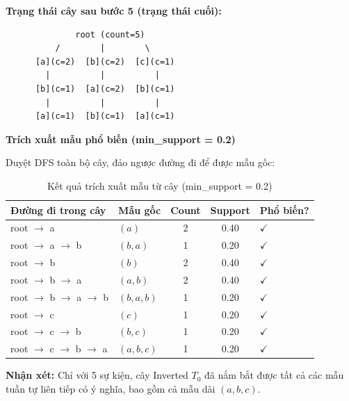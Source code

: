 \documentclass[14pt,a4paper,oneside]{extreport}
\begin{document}
\textbf{Trạng thái cây sau bước 5 (trạng thái cuối):}
\begin{verbatim}
              root (count=5)
          /        |        \
      [a](c=2)  [b](c=2)  [c](c=1)
        |          |          |
      [b](c=1)  [a](c=2)  [b](c=1)
        |          |          |
      [a](c=1)  [b](c=1)  [a](c=1)
\end{verbatim}

\vspace{1em}
\noindent\textbf{Trích xuất mẫu phổ biến (min\_support = 0.2)}

Duyệt DFS toàn bộ cây, đảo ngược đường đi để được mẫu gốc:

\begin{table}[H]
    \centering
    \caption{Kết quả trích xuất mẫu từ cây (min\_support = 0.2)}
    \label{tab:trace_patterns}
    \begin{tabular}{llccl}
        \toprule
        \textbf{Đường đi trong cây} & \textbf{Mẫu gốc} & \textbf{Count} & \textbf{Support} & \textbf{Phổ biến?} \\
        \midrule
        root $\rightarrow$ a              & $(a)$         & 2 & 0.40 & $\checkmark$ \\
        root $\rightarrow$ a $\rightarrow$ b     & $(b, a)$      & 1 & 0.20 & $\checkmark$ \\
        root $\rightarrow$ b              & $(b)$         & 2 & 0.40 & $\checkmark$ \\
        root $\rightarrow$ b $\rightarrow$ a     & $(a, b)$      & 2 & 0.40 & $\checkmark$ \\
        root $\rightarrow$ b $\rightarrow$ a $\rightarrow$ b & $(b, a, b)$ & 1 & 0.20 & $\checkmark$ \\
        root $\rightarrow$ c              & $(c)$         & 1 & 0.20 & $\checkmark$ \\
        root $\rightarrow$ c $\rightarrow$ b     & $(b, c)$      & 1 & 0.20 & $\checkmark$ \\
        root $\rightarrow$ c $\rightarrow$ b $\rightarrow$ a & $(a, b, c)$ & 1 & 0.20 & $\checkmark$ \\
        \bottomrule
    \end{tabular}
\end{table}

\textbf{Nhận xét:} Chỉ với 5 sự kiện, cây Inverted $T_0$ đã nắm bắt được tất cả các mẫu tuần tự liên tiếp có ý nghĩa, bao gồm cả mẫu dài $(a, b, c)$.

\end{document}
